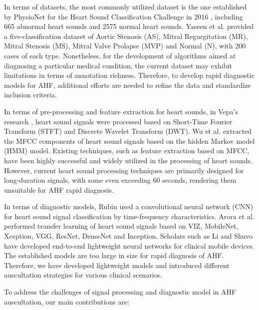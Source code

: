 In terms of datasets, the most commonly utilized dataset is the one established by PhysioNet for the Heart Sound Classification Challenge in 2016 \cite{clifford2016classification}, including 665 abnormal heart sounds and 2575 normal heart sounds. Yaseen et al. \cite{son2018classification} provided a five-classification dataset of Aortic Stenosis (AS), Mitral Regurgitation (MR), Mitral Stenosis (MS), Mitral Valve Prolapse (MVP) and Normal (N), with 200 cases of each type. Nonetheless, for the development of algorithms aimed at diagnosing a particular medical condition, the current dataset may exhibit limitations in terms of annotation richness. Therefore, to develop rapid diagnostic models for AHF, additional efforts are needed to refine the data and standardize inclusion criteria.

In terms of pre-processing and feature extraction for heart sounds, in Vepa's research \cite{vepa2009classification}, heart sound signals were processed based on Short-Time Fourier Transform (STFT) and Discrete Wavelet Transform (DWT). Wu et al. \cite{wu2010hidden} extracted the MFCC components of heart sound signals based on the hidden Markov model (HMM) model. Existing techniques, such as feature extraction based on MFCC, have been highly successful and widely utilized in the processing of heart sounds. However, current heart sound processing techniques are primarily designed for long-duration signals, with some even exceeding 60 seconds, rendering them unsuitable for AHF rapid diagnosis.

In terms of diagnostic models, Rubin \cite{rubin2016classifying} used a convolutional neural network (CNN) for heart sound signal classification by time-frequency characteristics. Arora et al. \cite{arora2021transfer} performed transfer learning of heart sound signals based on VIZ, MobileNet, Xception, VGG, ResNet, DenseNet and Inception. Scholars such as Li and Shuvo \cite{li2021lightweight,shuvo2021cardioxnet} have developed end-to-end lightweight neural networks for clinical mobile devices. The established models are too large in size for rapid diagnosis of AHF. Therefore, we have developed lightweight models and introduced different auscultation strategies for various clinical scenarios.

To address the challenges of signal processing and diagnostic model in AHF auscultation, our main contributions are:

